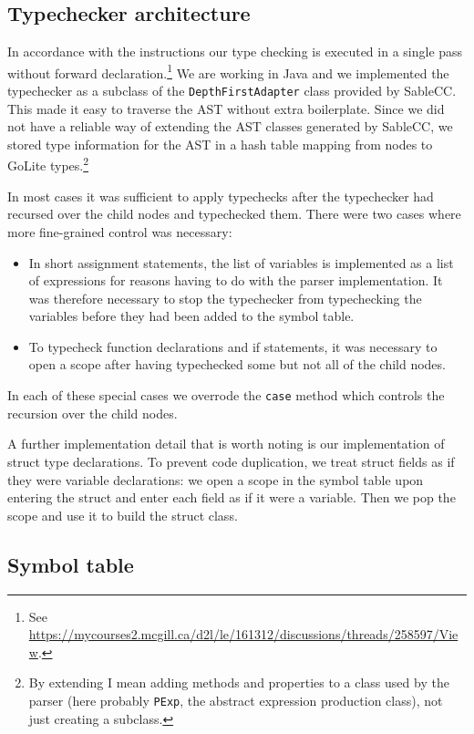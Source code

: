 \documentclass[oneside]{article}
\begin{document}
\subsection{Typechecker architecture}

In accordance with the instructions our type checking is executed in a single pass without forward declaration.\footnote{See \url{https://mycourses2.mcgill.ca/d2l/le/161312/discussions/threads/258597/View}.} We are working in Java and we implemented the typechecker as a subclass of the \verb|DepthFirstAdapter| class provided by SableCC. This made it easy to traverse the AST without extra boilerplate. Since we did not have a reliable way of extending the AST classes generated by SableCC, we stored type information for the AST in a hash table mapping from nodes to GoLite types.\footnote{By extending I mean adding methods and properties to a class used by the parser (here probably \texttt{PExp}, the abstract expression production class), not just creating a subclass.}

In most cases it was sufficient to apply typechecks after the typechecker had recursed over the child nodes and typechecked them. There were two cases where more fine-grained control was necessary:

\begin{itemize}
    \item In short assignment statements, the list of variables is implemented as a list of expressions for reasons having to do with the parser implementation. It was therefore necessary to stop the typechecker from typechecking the variables before they had been added to the symbol table.
    \item To typecheck function declarations and if statements, it was necessary to open a scope after having typechecked some but not all of the child nodes.
\end{itemize}

In each of these special cases we overrode the \verb|case| method which controls the recursion over the child nodes.

A further implementation detail that is worth noting is our implementation of struct type declarations. To prevent code duplication, we treat struct fields as if they were variable declarations: we open a scope in the symbol table upon entering the struct and enter each field as if it were a variable. Then we pop the scope and use it to build the struct class.

\subsection{Symbol table}
\end{document}
